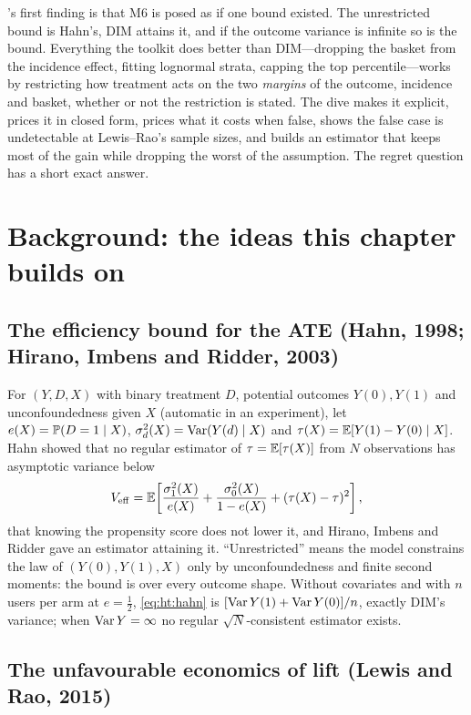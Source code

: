 's first finding is that M6 is posed as if one bound existed. The unrestricted bound is Hahn's, DIM attains it, and if the outcome variance is infinite so is the bound. Everything the toolkit does better than DIM---dropping the basket from the incidence effect, fitting lognormal strata, capping the top percentile---works by restricting how treatment acts on the two \emph{margins} of the outcome, incidence and basket, whether or not the restriction is stated. The dive makes it explicit, prices it in closed form, prices what it costs when false, shows the false case is undetectable at Lewis--Rao's sample sizes, and builds an estimator that keeps most of the gain while dropping the worst of the assumption. The regret question has a short exact answer.

\section{Background: the ideas this chapter builds on}

\subsection{The efficiency bound for the ATE (Hahn, 1998; Hirano, Imbens and Ridder, 2003)}

For $(Y, D, X)$ with binary treatment $D$, potential outcomes $Y(0), Y(1)$ and unconfoundedness given $X$ (automatic in an experiment), let $e(X) = \mathbb{P}(D = 1 \mid X)$, $\sigma_d^2(X) = \operatorname{Var}(Y(d) \mid X)$ and $\tau(X) = \mathbb{E}[Y(1) - Y(0) \mid X]$. Hahn showed that no regular estimator of $\tau = \mathbb{E}[\tau(X)]$ from $N$ observations has asymptotic variance below
\begin{equation}
V_{\mathrm{eff}} = \mathbb{E}\!\left[\frac{\sigma_1^2(X)}{e(X)} + \frac{\sigma_0^2(X)}{1 - e(X)} + (\tau(X) - \tau)^2\right],
\label{eq:ht:hahn}
\end{equation}
that knowing the propensity score does not lower it, and Hirano, Imbens and Ridder gave an estimator attaining it. ``Unrestricted'' means the model constrains the law of $(Y(0), Y(1), X)$ only by unconfoundedness and finite second moments: the bound is over every outcome shape. Without covariates and with $n$ users per arm at $e = \tfrac12$, \cref{eq:ht:hahn} is $[\operatorname{Var} Y(1) + \operatorname{Var} Y(0)]/n$, exactly DIM's variance; when $\operatorname{Var} Y = \infty$ no regular $\sqrt N$-consistent estimator exists.

\subsection{The unfavourable economics of lift (Lewis and Rao, 2015)}

